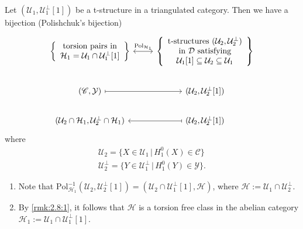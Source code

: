 \begin{prop}[Polishchuk]\label{prop:2.7}
  Let $(\mathcal{U}_1,\mathcal{U}_1^\perp[1])$ be a t-structure in a triangulated category.
  Then we have a bijection (Polishchuk's bijection)
  \begin{equation*}
    \begin{tikzcd}
      \left\{
      \begin{array}{c}
        \text{torsion pairs in} \\
        \mathcal{H}_1=\mathcal{U}_1\cap \mathcal{U}_1^\perp[1]
      \end{array}
      \right\}
      \arrow[leftrightarrow]{r}{\mathrm{Pol}_{\mathcal{H}_1}}
        &
        \left\{
          \begin{array}{c}
            \text{t-structures }
            (\mathcal{U}_2,\mathcal{U}_2^\perp) \\
            \text{ in } \mathcal{D}
            \text{ satisfying } \\ \mathcal{U}_1[1]\subseteq \mathcal{U}_2\subseteq\mathcal{U}_1
          \end{array}
        \right\}\\
      (\mathscr{C},\mathcal{Y})\arrow[mapsto]{r}
        & (\mathcal{U}_2,\mathcal{U}_2^\perp[1])\\
      (\mathcal{U}_2\cap\mathcal{H}_1,\mathcal{U}_2^\perp\cap\mathcal{H}_1)\arrow[mapsfrom]{r}
        & (\mathcal{U}_2,\mathcal{U}_2^\perp[1])
    \end{tikzcd}
  \end{equation*}
  where
  \begin{align*}
    \mathcal{U}_2 = \{X\in\mathcal{U}_1\,|\,H^0_1(X)\in\mathscr{C}\}\\
    \mathcal{U}_2^\perp = \{Y\in\mathcal{U}_1^\perp\,|\,H^0_1(Y)\in\mathcal{Y}\}.
  \end{align*}
\end{prop}

\begin{rmk}\label{rmk:2.8}
  \begin{enumerate}[label=(\arabic*)]
    \item\label{rmk:2.8:1} Note that $\mathrm{Pol}^{-1}_{\mathcal{H}_1}(\mathcal{U}_2,\mathcal{U}^\perp_2[1])=
      (\mathcal{U}_2\cap\mathcal{U}_1^\perp[1],\mathcal{H})$, where
      $\mathcal{H}:=\mathcal{U}_1\cap\mathcal{U}_2^\perp$.

    \item By \ref{rmk:2.8:1}, it follows that $\mathcal{H}$ is a torsion free class in the abelian category
      $\mathcal{H}_1:=\mathcal{U}_1\cap\mathcal{U}_1^\perp[1]$.
  \end{enumerate}
\end{rmk}

